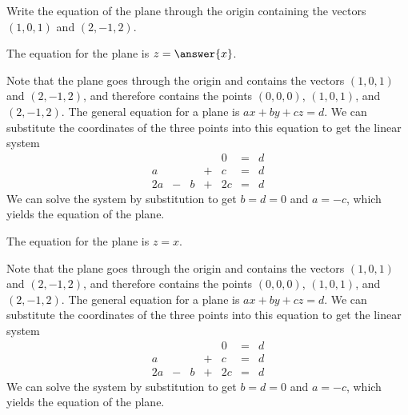 \documentclass{ximera}
\begin{document}
\begin{exercise} \label{c2.2.7}
Write the equation of the plane through the origin containing the
vectors $(1,0,1)$ and $(2,-1,2)$.
\begin{prompt}
  The equation for the plane is $z = \answer{x}$.
\end{prompt}
\begin{hint}
  Note that the plane goes through the origin and contains the
vectors $(1,0,1)$ and $(2,-1,2)$, and therefore contains the points
$(0,0,0)$, $(1,0,1)$, and $(2,-1,2)$.  The general equation for a plane
is $ax + by + cz = d$.  We can substitute the coordinates of the three
points into this equation to get the linear system
\[
\begin{array}{rrrrrrr}
 & & & & 0 & = & d \\
a & & & + & c & = & d \\
2a & - & b & + & 2c & = & d\end{array}
\]
We can solve the system by substitution to get $b = d = 0$ and $a = -c$,
which yields the equation of the plane.
\end{hint}

\begin{solution}

\ans The equation for the plane is $z = x$.

\soln Note that the plane goes through the origin and contains the
vectors $(1,0,1)$ and $(2,-1,2)$, and therefore contains the points
$(0,0,0)$, $(1,0,1)$, and $(2,-1,2)$.  The general equation for a plane
is $ax + by + cz = d$.  We can substitute the coordinates of the three
points into this equation to get the linear system
\[
\begin{array}{rrrrrrr}
 & & & & 0 & = & d \\
a & & & + & c & = & d \\
2a & - & b & + & 2c & = & d\end{array}
\]
We can solve the system by substitution to get $b = d = 0$ and $a = -c$,
which yields the equation of the plane.

\end{solution}
\end{exercise}
\end{document}
